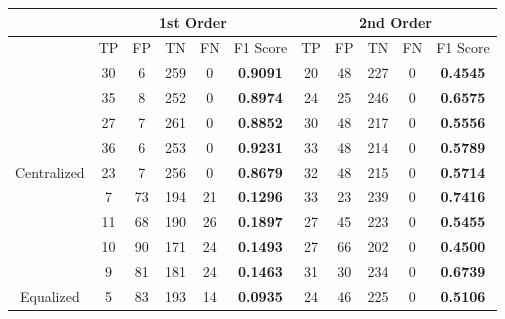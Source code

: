 \documentclass[10pt,a4paper]{article}
\begin{document}
		\begin{table}[!h]
			\centering
			\begin{tabular}{|c|c|c|c|c|c|c|c|c|c|c|}
				\hline
				& \multicolumn{5}{c|}{1st Order}                                                     & \multicolumn{5}{c|}{2nd Order}                              \\ \hline
				& TP & FP & TN  & FN                        & F1 Score                               & TP & FP & TN  & FN & F1 Score                               \\ \hline
				& 30 & 6  & 259 & {\color[HTML]{333333} 0}  & {\color[HTML]{FE0000} \textbf{0.9091}} & 20 & 48 & 227 & 0  & {\color[HTML]{FE0000} \textbf{0.4545}} \\ \cline{2-11} 
				& 35 & 8  & 252 & {\color[HTML]{333333} 0}  & {\color[HTML]{FE0000} \textbf{0.8974}} & 24 & 25 & 246 & 0  & {\color[HTML]{FE0000} \textbf{0.6575}} \\ \cline{2-11} 
				& 27 & 7  & 261 & {\color[HTML]{333333} 0}  & {\color[HTML]{FE0000} \textbf{0.8852}} & 30 & 48 & 217 & 0  & {\color[HTML]{FE0000} \textbf{0.5556}} \\ \cline{2-11} 
				& 36 & 6  & 253 & {\color[HTML]{333333} 0}  & {\color[HTML]{FE0000} \textbf{0.9231}} & 33 & 48 & 214 & 0  & {\color[HTML]{FE0000} \textbf{0.5789}} \\ \cline{2-11} 
				\multirow{-5}{*}{Centralized} & 23 & 7  & 256 & {\color[HTML]{333333} 0}  & {\color[HTML]{FE0000} \textbf{0.8679}} & 32 & 48 & 215 & 0  & {\color[HTML]{FE0000} \textbf{0.5714}} \\ \hline
				& 7  & 73 & 194 & {\color[HTML]{333333} 21} & {\color[HTML]{FE0000} \textbf{0.1296}} & 33 & 23 & 239 & 0  & {\color[HTML]{FE0000} \textbf{0.7416}} \\ \cline{2-11} 
				& 11 & 68 & 190 & {\color[HTML]{333333} 26} & {\color[HTML]{FE0000} \textbf{0.1897}} & 27 & 45 & 223 & 0  & {\color[HTML]{FE0000} \textbf{0.5455}} \\ \cline{2-11} 
				& 10 & 90 & 171 & {\color[HTML]{333333} 24} & {\color[HTML]{FE0000} \textbf{0.1493}} & 27 & 66 & 202 & 0  & {\color[HTML]{FE0000} \textbf{0.4500}} \\ \cline{2-11} 
				& 9  & 81 & 181 & {\color[HTML]{333333} 24} & {\color[HTML]{FE0000} \textbf{0.1463}} & 31 & 30 & 234 & 0  & {\color[HTML]{FE0000} \textbf{0.6739}} \\ \cline{2-11} 
				\multirow{-5}{*}{Equalized}   & 5  & 83 & 193 & {\color[HTML]{333333} 14} & {\color[HTML]{FE0000} \textbf{0.0935}} & 24 & 46 & 225 & 0  & {\color[HTML]{FE0000} \textbf{0.5106}} \\ \hline
			\end{tabular}
		\end{table}
		
\end{document}
